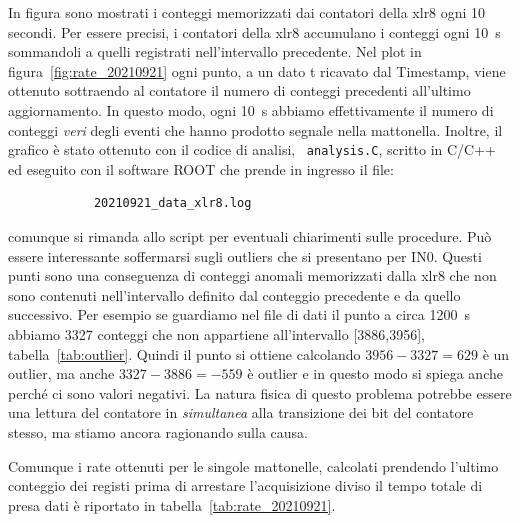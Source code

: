 \documentclass[11pt,a4paper]{article}
\begin{document}
    In figura sono mostrati i conteggi memorizzati dai contatori della xlr8 ogni 10 secondi.
    Per essere precisi, i contatori della xlr8 accumulano i conteggi ogni \SI{10}{s} sommandoli a quelli registrati nell'intervallo precedente.
    Nel plot in figura~\ref{fig:rate_20210921} ogni punto, a un dato t ricavato dal Timestamp, viene ottenuto sottraendo al contatore il numero di conteggi precedenti all'ultimo aggiornamento.
    In questo modo, ogni \SI{10}{s} abbiamo effettivamente il numero di conteggi \textit{veri} degli eventi che hanno prodotto segnale nella mattonella.
    Inoltre, il grafico è stato ottenuto con il codice di analisi, ~\verb|analysis.C|, scritto in C/C++ ed eseguito con il software ROOT che prende in ingresso il file:
    \begin{verbatim}
            20210921_data_xlr8.log
    \end{verbatim}
    comunque si rimanda allo script per eventuali chiarimenti sulle procedure.
    Può essere interessante soffermarsi sugli outliers che si presentano per IN0. Questi punti sono una conseguenza di conteggi anomali memorizzati dalla xlr8 che non sono contenuti nell'intervallo definito dal conteggio precedente e da quello successivo.
    Per esempio se guardiamo nel file di dati il punto a circa \SI{1200}{s} abbiamo 3327 conteggi che non appartiene all'intervallo [3886,3956], tabella~\ref{tab:outlier}.
    Quindi il punto si ottiene calcolando $3956-3327=629$ è un outlier, ma anche $3327-3886=-559$ è outlier e in questo modo si spiega anche perché ci sono valori negativi.
    La natura fisica di questo problema potrebbe essere una lettura del contatore in \textit{simultanea} alla transizione dei bit del contatore stesso, ma stiamo ancora ragionando sulla causa.

    Comunque i rate ottenuti per le singole mattonelle, calcolati prendendo l'ultimo conteggio dei registi prima di arrestare l'acquisizione diviso il tempo totale di presa dati è riportato in tabella~\ref{tab:rate_20210921}.
\end{document}
